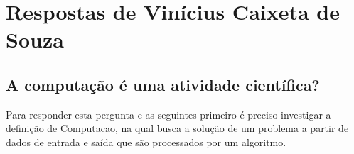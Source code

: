 \section{Respostas de Vinícius Caixeta de Souza}

\subsection{A computação é uma atividade científica?}
Para responder esta pergunta e as seguintes primeiro é preciso investigar a definição de \gls{Computacao}, na qual busca a solução de um problema a partir de dados de entrada e saída que são processados por um algoritmo.